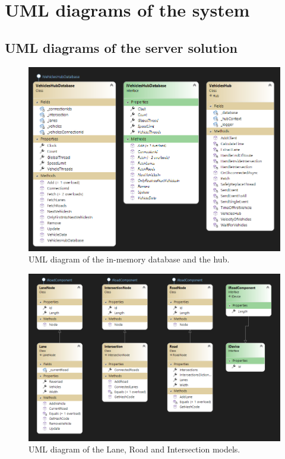 \chapter{UML diagrams of the system}\label{sec:uml}
\section{UML diagrams of the server solution}
\begin{figure}[h!]
	\centering
	\includegraphics[width=1\linewidth]{figures/Hub_and_database}
	\caption{UML diagram of the in-memory database and the hub.}
	\label{fig:hubanddatabase}
\end{figure}

\begin{figure}[h!]
	\centering
	\includegraphics[width=1\linewidth]{figures/IRoadComponents}
	\caption{UML diagram of the Lane, Road and Intersection models.}
	\label{fig:iroadcomponents}
\end{figure}

